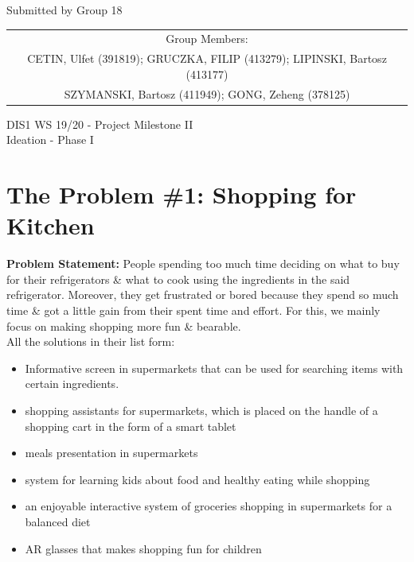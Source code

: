 \documentclass[a4paper,10pt,oneside]{scrreprt}
\begin{document}
\begin{center}
	Submitted by Group 18

	\bigskip

	\begin{tabular}{c}
	Group Members: \\
	CETIN, Ulfet (391819); GRUCZKA, FILIP (413279);	LIPINSKI, Bartosz (413177) \\
	SZYMANSKI, Bartosz (411949); GONG, Zeheng (378125)\\
	\end{tabular}

	\bigskip

	DIS1 WS 19/20 - Project Milestone II\\
	Ideation - Phase I\\

\end{center}
\vspace{-1cm}

\begingroup
\let\clearpage\relax
	\chapter{The Problem \#1: Shopping for Kitchen}
\endgroup
				\vspace{-0.5cm}
				\textbf{Problem Statement:} People spending too much time deciding on what to buy for their refrigerators \& what to cook using the ingredients in the said refrigerator. Moreover, they get frustrated or bored because they spend so much time \& got a little gain from their spent time and effort. For this, we mainly focus on making shopping more fun \& bearable.\\
				
				All the solutions in their list form:
				\begin{itemize}
					\item Informative screen in supermarkets that can be used for searching items with certain ingredients.
					\item shopping assistants for supermarkets, which is placed on the handle of a shopping cart in the form of a smart tablet
					\item meals presentation in supermarkets
					
					\item system for learning kids about food and healthy eating while shopping
					
					\item an enjoyable interactive system of groceries shopping in supermarkets for a balanced diet
					
					\item AR glasses that makes shopping fun for children
				\end{itemize}
\end{document}
